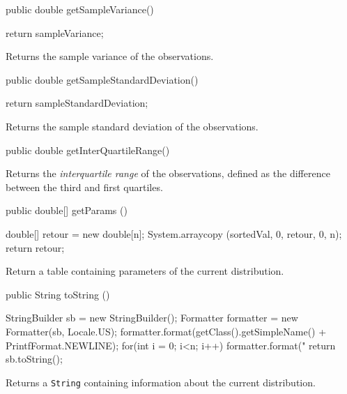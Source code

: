 \begin{code}

   public double getSampleVariance()\begin{hide} {
      return sampleVariance;
   }\end{hide}
\end{code}
\begin{tabb}   Returns the sample variance of the observations.
\end{tabb}
\begin{code}

   public double getSampleStandardDeviation()\begin{hide} {
      return sampleStandardDeviation;
   }\end{hide}
\end{code}
\begin{tabb}   Returns the sample standard deviation of the observations.
\end{tabb}
\begin{code}

   public double getInterQuartileRange()
\end{code}
\begin{tabb}   Returns the \emph{interquartile range} of the observations,
   defined as the difference between the third and first quartiles.
\end{tabb}
\begin{code}

   public double[] getParams ()\begin{hide} {
      double[] retour = new double[n];
      System.arraycopy (sortedVal, 0, retour, 0, n);
      return retour;
   }\end{hide}
\end{code}
\begin{tabb}
   Return a table containing parameters of the current distribution.
\end{tabb}
\begin{code}

   public String toString ()\begin{hide} {
      StringBuilder sb = new StringBuilder();
      Formatter formatter = new Formatter(sb, Locale.US);
      formatter.format(getClass().getSimpleName() + PrintfFormat.NEWLINE);
      for(int i = 0; i<n; i++) {
         formatter.format("%
      }
      return sb.toString();
   }\end{hide}
\end{code}
\begin{tabb}
   Returns a \texttt{String} containing information about the current distribution.
\end{tabb}
\begin{code}\begin{hide}
}\end{hide}
\end{code}

